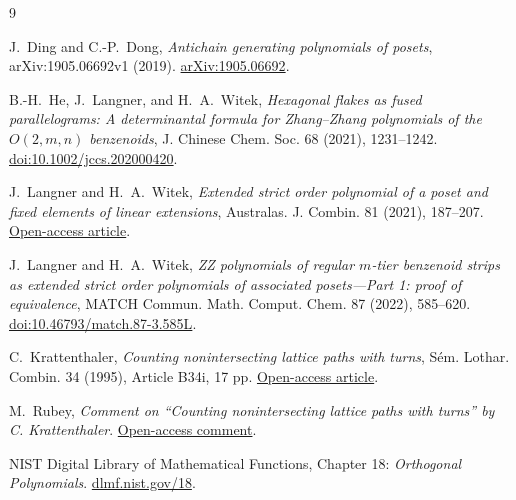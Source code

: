 \documentclass[11pt]{article}
\numberwithin{equation}{section}
\begin{document}
\begin{thebibliography}{9}
\footnotesize
\raggedright

J.~Ding and C.-P.~Dong,
\emph{Antichain generating polynomials of posets},
arXiv:1905.06692v1 (2019).
\href{https://arxiv.org/abs/1905.06692}{arXiv:1905.06692}.

B.-H.~He, J.~Langner, and H.~A.~Witek,
\emph{Hexagonal flakes as fused parallelograms: A determinantal formula for
Zhang--Zhang polynomials of the $O(2,m,n)$ benzenoids},
J. Chinese Chem. Soc. 68 (2021), 1231--1242.
\href{https://doi.org/10.1002/jccs.202000420}{doi:10.1002/jccs.202000420}.

J.~Langner and H.~A.~Witek,
\emph{Extended strict order polynomial of a poset and fixed elements of linear extensions},
Australas. J. Combin. 81 (2021), 187--207.
\href{https://ajc.maths.uq.edu.au/pdf/81/ajc_v81_p187.pdf}{Open-access article}.

J.~Langner and H.~A.~Witek,
\emph{ZZ polynomials of regular $m$-tier benzenoid strips as extended strict
order polynomials of associated posets---Part 1: proof of equivalence},
MATCH Commun. Math. Comput. Chem. 87 (2022), 585--620.
\href{https://doi.org/10.46793/match.87-3.585L}{doi:10.46793/match.87-3.585L}.

C.~Krattenthaler,
\emph{Counting nonintersecting lattice paths with turns},
S\'em. Lothar. Combin. 34 (1995), Article B34i, 17 pp.
\href{https://www.mat.univie.ac.at/~slc/wpapers/s34vienna.pdf}{Open-access article}.

M.~Rubey,
\emph{Comment on ``Counting nonintersecting lattice paths with turns'' by
C. Krattenthaler}.
\href{https://www.mat.univie.ac.at/~slc/wpapers/s34rubey.pdf}{Open-access comment}.

NIST Digital Library of Mathematical Functions,
Chapter 18: \emph{Orthogonal Polynomials}.
\href{https://dlmf.nist.gov/18}{dlmf.nist.gov/18}.

\end{thebibliography}
\end{document}
